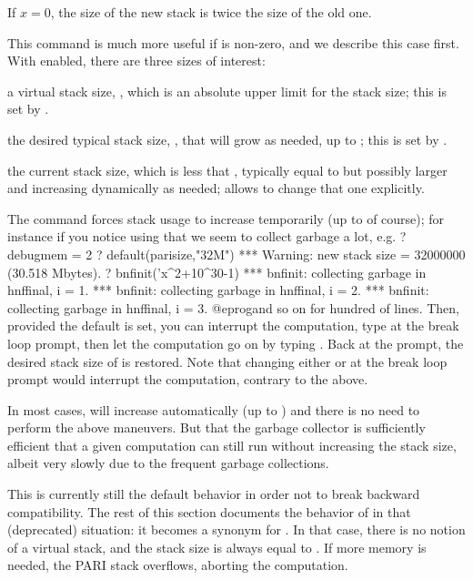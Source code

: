 If $x=0$, the size of the new stack is twice the size of the old one.

This command is much more useful if  is non-zero, and we
describe this case first. With  enabled, there are three
sizes of interest:

\item a virtual stack size, , which is an absolute upper
limit for the stack size; this is set by .

\item the desired typical stack size, , that will grow as
needed, up to ; this is set by .

\item the current stack size, which is less that ,
typically equal to  but possibly larger and increasing
dynamically as needed;  allows to change that one
explicitly.

The  command forces stack
usage to increase temporarily (up to  of course); for
instance if you notice using  that we seem to collect garbage a
lot, e.g.
\bprog
? 
  debugmem = 2
? default(parisize,"32M")
 ***   Warning: new stack size = 32000000 (30.518 Mbytes).
? bnfinit('x^2+10^30-1)
 *** bnfinit: collecting garbage in hnffinal, i = 1.
 *** bnfinit: collecting garbage in hnffinal, i = 2.
 *** bnfinit: collecting garbage in hnffinal, i = 3.
@eprog\noindent and so on for hundred of lines. Then, provided the
 default is set, you can interrupt the computation, type
 at the break loop prompt, then let the
computation go on by typing . Back at the  prompt,
the desired stack size of  is restored. Note that changing either
 or  at the break loop prompt would interrupt
the computation, contrary to the above.

In most cases,  will increase automatically (up to
) and there is no need to perform the above maneuvers.
But that the garbage collector is sufficiently efficient that
a given computation can still run without increasing the stack size,
albeit very slowly due to the frequent garbage collections.

This is currently still the default behavior in order not to break backward
compatibility. The rest of this section documents the
behavior of  in that (deprecated) situation: it becomes a
synonym for . In that case, there is no
notion of a virtual stack, and the stack size is always equal to
. If more memory is needed, the PARI stack overflows, aborting
the computation.

